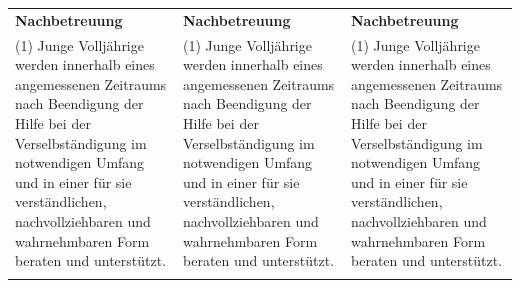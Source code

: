 \documentclass[10pt,a4paper,landscape]{article}
\begin{document}
\begin{longtable}{|L{8.2cm}|L{8.2cm}|L{8.2cm}|}
\hhline{|---|}
\textbf{Nachbetreuung} & \textbf{Nachbetreuung} & \textbf{Nachbetreuung} \\
\hhline{|---|}
(1) Junge Volljährige werden innerhalb  \newline eines angemessenen Zeitraums nach  \newline Beendigung der Hilfe bei der  \newline Verselbständigung im notwendigen  \newline Umfang und in einer für sie verständlichen,  \newline nachvollziehbaren und wahrnehmbaren  \newline Form beraten und unterstützt. & (1) Junge Volljährige werden innerhalb  \newline eines angemessenen Zeitraums nach  \newline Beendigung der Hilfe bei der  \newline Verselbständigung im notwendigen  \newline Umfang und in einer für sie verständlichen,  \newline nachvollziehbaren und wahrnehmbaren  \newline Form beraten und unterstützt. & (1) Junge Volljährige werden innerhalb  \newline eines angemessenen Zeitraums nach  \newline Beendigung der Hilfe bei der  \newline Verselbständigung im notwendigen  \newline Umfang und in einer für sie verständlichen,  \newline nachvollziehbaren und wahrnehmbaren  \newline Form beraten und unterstützt. \\
\hhline{|---|}

\end{longtable}
\end{document}
